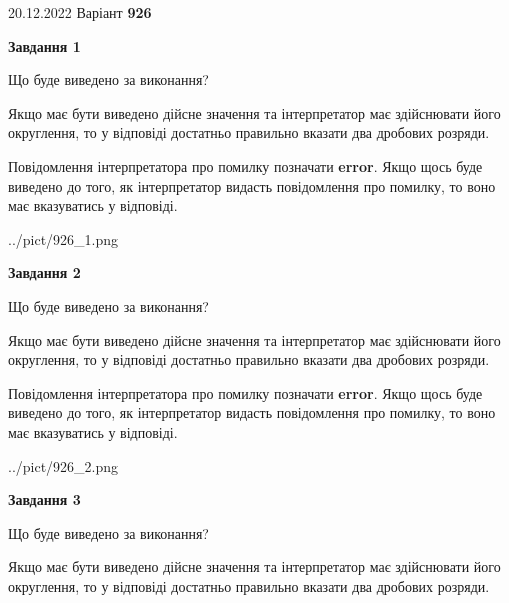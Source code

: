 \documentclass[12pt, ukrainian]{article}
\begin{document}
{20.12.2022 Варіант \No \textbf { 926 }\par}
{
\begin {Large}

{\begin {center}\textbf{Завдання 1}\end {center}}\par
Що буде виведено за виконання? \par

Якщо має бути виведено дійсне значення та інтерпретатор має здійснювати його округлення, 
то у відповіді достатньо правильно вказати два дробових розряди.

Повідомлення інтерпретатора про помилку позначати \textbf{error}.
Якщо щось буде виведено до того, як інтерпретатор видасть повідомлення про помилку, 
то воно має вказуватись у відповіді. \par

\begin{center}
	{../pict/926_1.png}
\end{center}
\newpage

{\begin {center}\textbf{Завдання 2}\end {center}}\par
Що буде виведено за виконання? \par

Якщо має бути виведено дійсне значення та інтерпретатор має здійснювати його округлення, 
то у відповіді достатньо правильно вказати два дробових розряди.

Повідомлення інтерпретатора про помилку позначати \textbf{error}.
Якщо щось буде виведено до того, як інтерпретатор видасть повідомлення про помилку, 
то воно має вказуватись у відповіді. \par

\begin{center}
	{../pict/926_2.png}
\end{center}
\newpage

{\begin {center}\textbf{Завдання 3}\end {center}}\par
Що буде виведено за виконання? \par

Якщо має бути виведено дійсне значення та інтерпретатор має здійснювати його округлення, 
то у відповіді достатньо правильно вказати два дробових розряди.


\end{Large}}
\end{document}
